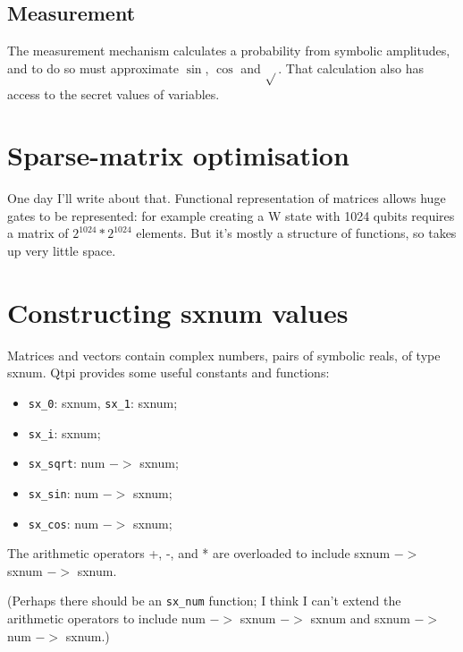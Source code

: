 \subsection{Measurement}

The measurement mechanism calculates a probability from symbolic amplitudes, and to do so must approximate $\sin{}$, $\cos{}$ and $\sqrt{}$. That calculation also has access to the secret values of variables.

\section{Sparse-matrix optimisation}

One day I'll write about that. Functional representation of matrices allows huge gates to be represented: for example creating a W state with 1024 qubits requires a matrix of $2^{1024}*2^{1024}$ elements. But it's mostly a structure of functions, so takes up very little space.

\section{Constructing sxnum values}

Matrices and vectors contain complex numbers, pairs of symbolic reals, of type sxnum. Qtpi provides some useful constants and functions:
\begin{itemize}
\item \verb|sx_0|: sxnum, \verb|sx_1|: sxnum;
\item \verb|sx_i|: sxnum;
\item \verb|sx_sqrt|: num $->$ sxnum;
\item \verb|sx_sin|: num $->$ sxnum;
\item \verb|sx_cos|: num $->$ sxnum;
\end{itemize}
The arithmetic operators +, -, and * are overloaded to include sxnum $->$ sxnum $->$ sxnum. 

(Perhaps there should be an \verb|sx_num| function; I think I can't extend the arithmetic operators to include num $->$ sxnum $->$ sxnum and sxnum $->$ num $->$ sxnum.)
